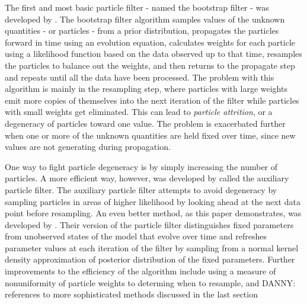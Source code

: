 \documentclass{elsarticle}
\newcommand{\danny}[1]{{\color{blue}DANNY: #1}}
\begin{document}
The first and most basic particle filter - named the bootstrap filter - was developed by \citet{Gord:Salm:Smit:nove:1993}.  The bootstrap filter algorithm samples values of the unknown quantities - or particles - from a prior distribution, propagates the particles forward in time using an evolution equation, calculates weights for each particle using a likelihood function based on the data observed up to that time, resamples the particles to balance out the weights, and then returns to the propagate step and repeats until all the data have been processed.  The problem with this algorithm is mainly in the resampling step, where particles with large weights emit more copies of themselves into the next iteration of the filter while particles with small weights get eliminated.  This can lead to \emph{particle attrition}, or a degeneracy of particles toward one value.  The problem is exacerbated further when one or more of the unknown quantities are held fixed over time, since new values are not generating during propagation.

One way to fight particle degeneracy is by simply increasing the number of particles.  A more efficient way, however, was developed by \citet{Pitt:Shep:filt:1999} called the auxiliary particle filter.  The auxiliary particle filter attempts to avoid degeneracy by sampling particles in areas of higher likelihood by looking ahead at the next data point before resampling.  An even better method, as this paper demonstrates, was developed by \citet{Liu:West:comb:2001}.  Their version of the particle filter distinguishes fixed parameters from unobserved states of the model that evolve over time and refreshes parameter values at each iteration of the filter by sampling from a normal kernel density approximation of posterior distribution of the fixed parameters.  Further improvements to the efficiency of the algorithm include using a measure of nonuniformity of particle weights to determing when to resample, and \danny{references to more sophisticated methods discussed in the last section}





\end{document}
